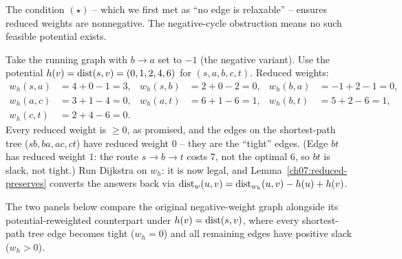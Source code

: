 \begin{whybox}
The condition $(\star)$ -- which we first met as ``no edge is
relaxable'' -- ensures reduced weights are nonnegative. The negative-cycle obstruction means no such feasible potential exists.
\end{whybox}

\begin{labbox}
Take the running graph with $b\to a$ set to $-1$ (the negative variant). Use the
potential $h(v)=\operatorname{dist}(s,v)=(0,1,2,4,6)$ for $(s,a,b,c,t)$. Reduced weights:
\[
\begin{aligned}
 w_h(s,a)&=4+0-1=3, & w_h(s,b)&=2+0-2=0, & w_h(b,a)&=-1+2-1=0,\\
 w_h(a,c)&=3+1-4=0, & w_h(a,t)&=6+1-6=1, & w_h(b,t)&=5+2-6=1,\\
 w_h(c,t)&=2+4-6=0. & & & &
\end{aligned}
\]
Every reduced weight is $\ge 0$, as promised, and the edges on the shortest-path tree
($sb,ba,ac,ct$) have reduced weight $0$ -- they are the ``tight'' edges. (Edge $bt$ has
reduced weight $1$: the route $s\to b\to t$ costs $7$, not the optimal $6$, so $bt$ is
slack, not tight.) Run
Dijkstra on $w_h$: it is now legal, and Lemma~\ref{ch07:reduced-preserves} converts the
answers back via $\operatorname{dist}_w(u,v)=\operatorname{dist}_{w_h}(u,v)-h(u)+h(v)$.
\end{labbox}

The two panels below compare the original negative-weight graph alongside its potential-reweighted counterpart under $h(v)=\operatorname{dist}(s,v)$, where every shortest-path tree edge becomes tight ($w_h=0$) and all remaining edges have positive slack ($w_h>0$).


